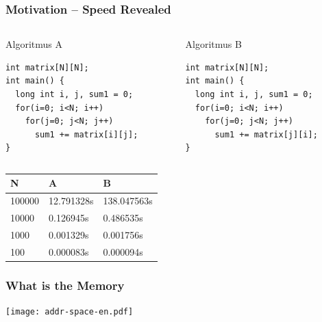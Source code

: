 \documentclass{beamer}
\begin{document}
\begin{frame}[fragile]
\frametitle{Motivation -- Speed Revealed}

\begin{columns}
\begin{column}{0.45\textwidth}
Algoritmus A\\
\begin{verbatim}
int matrix[N][N];
int main() {
  long int i, j, sum1 = 0;
  for(i=0; i<N; i++)
    for(j=0; j<N; j++)
      sum1 += matrix[i][j];
}
\end{verbatim}
\end{column}
\hfill
\begin{column}{0.45\textwidth}
Algoritmus B\\
\begin{verbatim}
int matrix[N][N];
int main() {
  long int i, j, sum1 = 0;
  for(i=0; i<N; i++)
    for(j=0; j<N; j++)
      sum1 += matrix[j][i];
}
\end{verbatim}
\end{column}
\end{columns}
\bigskip

\begin{tabular}{|l|l|l|}\hline
N & A & B \\\hline
100000 & 12.791328s &138.047563s \\\hline
10000 & 0.126945s &0.486535s \\\hline
1000 & 0.001329s &0.001756s \\\hline
100 & 0.000083s &0.000094s \\\hline
\end{tabular}
\end{frame}

\begin{frame}
\frametitle{What is the Memory}

\centering

\texttt{[image: addr-space-en.pdf]}

\end{frame}
\end{document}
